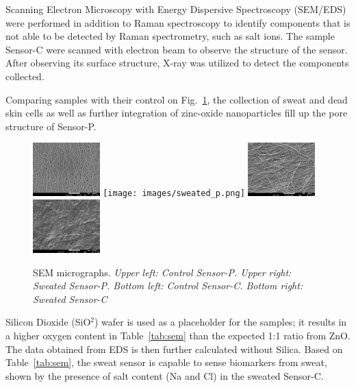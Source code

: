 \documentclass[journal]{IEEEtran}
\begin{document}
Scanning Electron Microscopy with Energy Dispersive Spectroscopy (SEM/EDS) were performed in addition to Raman spectroscopy to identify components that is not able to be detected by Raman spectrometry, such as salt ions. The sample Sensor-C were scanned with electron beam to observe the structure of the sensor. After observing its surface structure, X-ray was utilized to detect the components collected. 

Comparing samples with their control on Fig.~\ref{fig:sem}, the collection of sweat and dead skin cells as well as further integration of zinc-oxide nanoparticles fill up the pore structure of Sensor-P. 

\begin{figure}[H]
\begin{center}
\includegraphics[width=0.23\textwidth]{images/Control_P.png}
\texttt{[image: images/sweated\_p.png]}
\includegraphics[width=0.23\textwidth]{images/control_C.png}
\includegraphics[width=0.23\textwidth]{images/sweated_C.png}
\caption{SEM micrographs. \textit{Upper left: Control Sensor-P. Upper right: Sweated Sensor-P. Bottom left: Control Sensor-C. Bottom right: Sweated Sensor-C}} \label{fig:sem}
\end{center}
\end{figure}

Silicon Dioxide (SiO$^2$) wafer is used as a placeholder for the samples; it results in a higher oxygen content in Table~\ref{tab:sem} than the expected 1:1 ratio from ZnO. The data obtained from EDS is then further calculated without Silica. Based on Table~\ref{tab:sem}, the sweat sensor is capable to sense biomarkers from sweat, shown by the presence of salt content (Na and Cl) in the sweated Sensor-C. 
\end{document}
